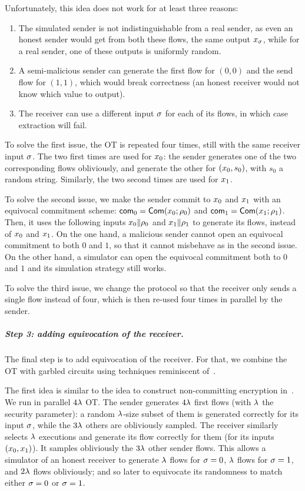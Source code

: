 Unfortunately, this idea does not work for at least three reasons:
\begin{enumerate}
\item The simulated sender is not indistinguishable from a real sender, as even an honest sender would get from both these flows, the same output $x_\sigma$, while for a real sender, one of these outputs is uniformly random.
\item A semi-malicious sender can generate the first flow for $(0,0)$ and the send flow for $(1,1)$, which would break correctness (an honest receiver would not know which value to output).
\item The receiver can use a different input $\sigma$ for each of its flows, in which case extraction will fail.
\end{enumerate}

To solve the first issue, the OT is repeated four times, still with the same receiver input $\sigma$. The two first times are used for $x_0$: the sender generates one of the two corresponding flows obliviously, and generate the other for $(x_0,s_0)$, with $s_0$ a random string.
Similarly, the two second times are used for $x_1$.

To solve the second issue, we make the sender commit to $x_0$ and $x_1$ with an equivocal commitment scheme: $\mathsf{com}_0 = \mathsf{Com}(x_0;\rho_0)$ and $\mathsf{com}_1 = \mathsf{Com}(x_1;\rho_1)$. Then, it uses the following inputs $x_0 \| \rho_0$ and $x_1 \| \rho_1$ to generate its flows, instead of $x_0$ and $x_1$.
On the one hand, a malicious sender cannot open an equivocal commitment to both $0$ and $1$, so that it cannot misbehave as in the second issue.
On the other hand, a simulator can open the equivocal commitment both to $0$ and $1$ and its simulation strategy still works.


To solve the third issue, we change the protocol so that the receiver only sends a single flow instead of four, which is then re-used four times in parallel by the sender.

\subparagraph{Step 3: adding equivocation of the receiver.}
The final step is to add equivocation of the receiver.
For that, we combine the OT with garbled circuits using techniques reminiscent of~\cite{C:CDGGMP17,C:DotGar17,EC:BenLin18,EC:GarSri18}.

The first idea is similar to the idea to construct non-committing encryption in~\cite{AC:CDMW09}.
We run in parallel $4 \lambda$ OT.
The sender generates $4 \lambda$ first flows (with $\lambda$ the security parameter): a random $\lambda$-size subset of them is generated correctly for its input $\sigma$, while the $3\lambda$ others are obliviously sampled.
The receiver similarly selects $\lambda$ executions and generate its flow correctly for them (for its inputs $(x_0,x_1)$).
It samples obliviously the $3\lambda$ other sender flows.
This allows a simulator of an honest receiver to generate $\lambda$ flows for $\sigma=0$, $\lambda$ flows for $\sigma=1$, and $2\lambda$ flows obliviously; and so later to equivocate its randomness to match either $\sigma = 0$ or $\sigma = 1$.

